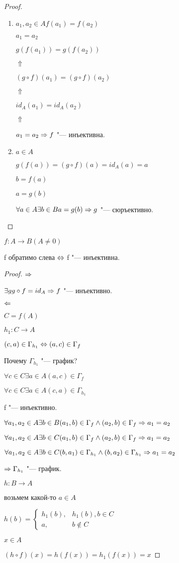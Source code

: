 \begin{proof}
\begin{enumerate}
\item $a_1, a_2 \in A f(a_1) = f(a_2)$

$a_1 = a_2$

$g(f(a_1)) = g(f(a_2))$

$\Uparrow$

$(g \circ f)(a_1) = (g \circ f)(a_2)$

$\Uparrow$

$id_A(a_1) = id_A(a_2)$

$\Uparrow$

$a_1 = a_2 \Rightarrow f$ "--- инъективна.

\item $a \in A$

$g(f(a)) = (g \circ f)(a) = id_A(a) = a$

$b = f(a)$

$a = g(b)$

$\forall a \in A \exists b \in B a = g(b) \Rightarrow  g$ "--- сюръективно.   
\end{enumerate}
\end{proof}

\begin{theorem}{}
$f:A \to B (A \ne 0)$

f обратимо слева $\Leftrightarrow$ f "--- инъективна.

\end{theorem}

\begin{proof}
$\Rightarrow$

$\exists g g \circ f = id_A \Rightarrow f$ "--- инъективно.

$\Leftarrow$ 

$C = f(A)$

$h_1: C \to A$

$(c, a) \in \Gamma_{h_1} \Leftrightarrow (a, c) \in \Gamma_{f}$

Почему $\Gamma_{h_1}$ "--- график?

$\forall c \in C \exists a \in A (a, c) \in \Gamma_{f}$

$\forall c \in C \exists a \in A (c, a) \in \Gamma_{h_1}$

f "--- инъективно. 

$\forall a_1, a_2 \in A \exists b \in B (a_1, b) \in \Gamma_{f} \wedge (a_2, b)\in \Gamma_{f} \Rightarrow a_1 = a_2$

$\forall a_1, a_2 \in A \exists b \in C (a_1, b) \in \Gamma_{f} \wedge (a_2, b)\in \Gamma_{f} \Rightarrow a_1 = a_2$

$\forall a_1, a_2 \in A \exists b \in C (b, a_1) \in \Gamma_{h_1} \wedge (b, a_2)\in \Gamma_{h_1} \Rightarrow a_1 = a_2$

$\Rightarrow \Gamma_{h_1}$ "--- график.

$h: B \to A$

возьмем какой-то $a \in A$

$h(b) = \begin{cases} h_1(b), & h_1(b), b \in C\\ a, &b \notin C\end{cases}$

$x \in A$

$(h \circ f)(x) = h(f(x)) = h_1(f(x)) = x$
\end{proof}